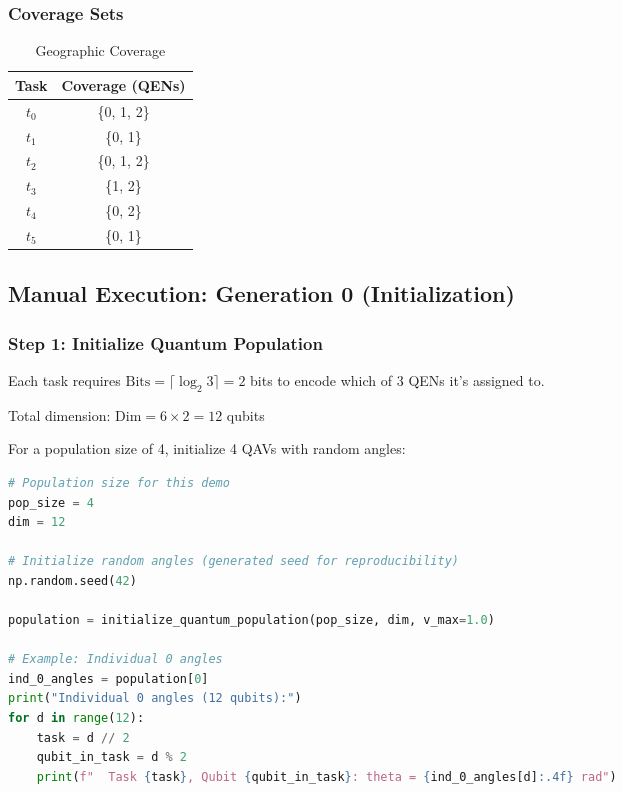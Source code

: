 \documentclass[12pt,a4paper]{article}
\begin{document}
\subsubsection{Coverage Sets}

\begin{table}[H]
\centering
\caption{Geographic Coverage}
\begin{tabular}{|c|c|}
\hline
Task & Coverage (QENs) \\
\hline
$t_0$ & \{0, 1, 2\} \\
\hline
$t_1$ & \{0, 1\} \\
\hline
$t_2$ & \{0, 1, 2\} \\
\hline
$t_3$ & \{1, 2\} \\
\hline
$t_4$ & \{0, 2\} \\
\hline
$t_5$ & \{0, 1\} \\
\hline
\end{tabular}
\end{table}

\subsection{Manual Execution: Generation 0 (Initialization)}

\subsubsection{Step 1: Initialize Quantum Population}

Each task requires $\mathrm{Bits} = \lceil \log_2 3 \rceil = 2$ bits to encode which of 3 QENs it's assigned to.

Total dimension: $\mathrm{Dim} = 6 \times 2 = 12$ qubits

For a population size of 4, initialize 4 QAVs with random angles:

\begin{lstlisting}[language=Python, caption=Manual Initialization Example]
# Population size for this demo
pop_size = 4
dim = 12

# Initialize random angles (generated seed for reproducibility)
np.random.seed(42)

population = initialize_quantum_population(pop_size, dim, v_max=1.0)

# Example: Individual 0 angles
ind_0_angles = population[0]
print("Individual 0 angles (12 qubits):")
for d in range(12):
    task = d // 2
    qubit_in_task = d % 2
    print(f"  Task {task}, Qubit {qubit_in_task}: theta = {ind_0_angles[d]:.4f} rad")
\end{lstlisting}
\end{document}
